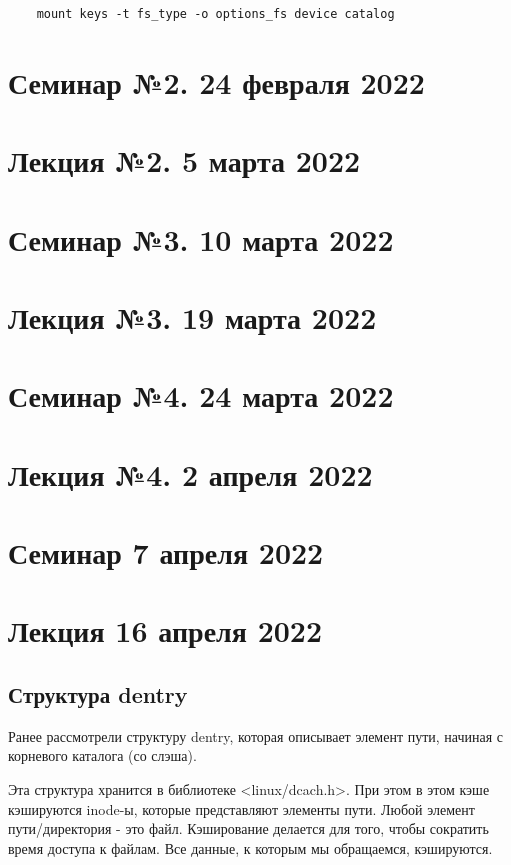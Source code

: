 \documentclass[12pt,a4paper]{scrreprt}
\begin{document}
\begin{lstlisting}
	mount keys -t fs_type -o options_fs device catalog
\end{lstlisting}

\chapter{\textbf{Семинар №2. 24 февраля 2022}}

\chapter{\textbf{Лекция №2. 5 марта 2022}}

\chapter{\textbf{Семинар №3. 10 марта 2022}}

\chapter{\textbf{Лекция №3. 19 марта 2022}}

\chapter{\textbf{Семинар №4. 24 марта 2022}}

\chapter{\textbf{Лекция №4. 2 апреля 2022}}

\chapter{\textbf{Семинар 7 апреля 2022}}

\chapter{\textbf{Лекция 16 апреля 2022}}

\section{Структура dentry}

Ранее рассмотрели структуру dentry, которая описывает элемент пути, начиная с корневого каталога (со слэша). 

Эта структура хранится в библиотеке <linux/dcach.h>. При этом в этом кэше кэшируются inode-ы, которые представляют элементы пути. Любой элемент пути/директория - это файл. Кэширование делается для того, чтобы сократить время доступа к файлам. Все данные, к которым мы обращаемся, кэшируются.
\end{document}
